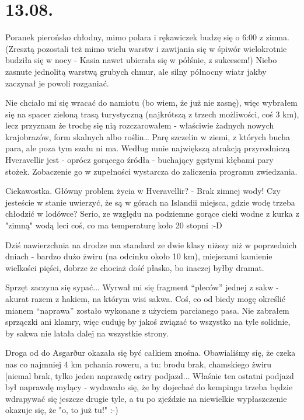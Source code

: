\chapter{13.08.}

Poranek pierońsko chłodny, mimo polara i rękawiczek budzę się o 6:00 z zimna. (Zresztą pozostali też mimo wielu warstw i zawijania się w śpiwór wielokrotnie budziła się w nocy - Kasia nawet ubierała się w półśnie, z sukcesem!) Niebo zasnute jednolitą warstwą grubych chmur, ale silny północny wiatr jakby zaczynał je powoli rozganiać.

Nie chciało mi się wracać do namiotu (bo wiem, że już nie zasnę), więc wybrałem się na spacer zieloną trasą turystyczną (najkrótszą z trzech możliwości, coś 3 km), lecz przyznam że trochę się nią rozczarowałem - właściwie żadnych nowych krajobrazów, form skalnych albo roślin… Parę szczelin w ziemi, z których bucha para, ale poza tym szału ni ma. Według mnie największą atrakcją przyrodniczą Hveravellir jest - oprócz gorącego źródła - buchający gęstymi kłębami pary stożek. Zobaczenie go w zupełności wystarcza do zaliczenia programu zwiedzania.

Ciekawostka. Główny problem życia w Hveravellir? - Brak zimnej wody! Czy jesteście w stanie uwierzyć, że są w górach na Islandii miejsca, gdzie wodę trzeba chłodzić w lodówce? Serio, ze względu na podziemne gorące cieki wodne z kurka z "zimną" wodą leci coś, co ma temperaturę koło 20 stopni :-D

Dziś nawierzchnia na drodze ma standard ze dwie klasy niższy niż w poprzednich dniach - bardzo dużo żwiru (na odcinku około 10 km), miejscami kamienie wielkości pięści, dobrze że chociaż dość płasko, bo inaczej byłby dramat.


Sprzęt zaczyna się sypać... Wyrwał mi się fragment “pleców” jednej z sakw - akurat razem z hakiem, na którym wisi sakwa. Coś, co od biedy mogę określić mianem “naprawa” zostało wykonane z użyciem parcianego pasa. Nie zabrałem sprzączki ani klamry, więc cuduję by jakoś związać to wszystko na tyle solidnie, by sakwa nie latała dalej na wszystkie strony.

Droga od  do Asgarður okazała się być całkiem znośna. Obawialiśmy się, że czeka nas co najmniej 4 km pchania roweru, a tu: brodu brak, chamskiego żwiru [niemal brak, tylko jeden naprawdę ostry podjazd... Właśnie ten ostatni podjazd był naprawdę mylący - wydawało się, że by dojechać do kempingu trzeba będzie wdrapywać się jeszcze drugie tyle, a tu po zjeździe na niewielkie wypłaszczenie okazuje się, że "o, to już tu!" :-)

